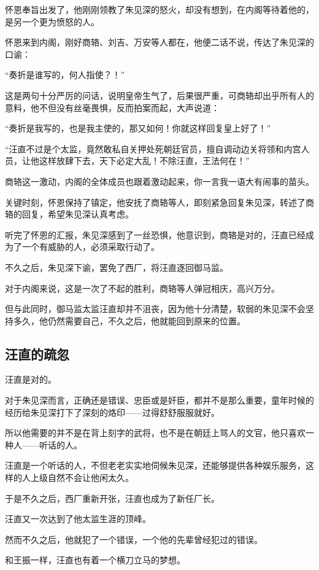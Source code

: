 \begin{multicols}{\theparacolNo}
		怀恩奉旨出发了，他刚刚领教了朱见深的怒火，却没有想到，在内阁等待着他的，是另一个更为愤怒的人。

		怀恩来到内阁，刚好商辂、刘吉、万安等人都在，他便二话不说，传达了朱见深的口谕：

		“奏折是谁写的，何人指使？！”

		这是两句十分严厉的问话，说明皇帝生气了，后果很严重，可商辂却出乎所有人的意料，他不但没有丝毫畏惧，反而拍案而起，大声说道：

		“奏折是我写的，也是我主使的，那又如何！你就这样回复皇上好了！”

		“汪直不过是个太监，竟然敢私自关押处死朝廷官员，擅自调动边关将领和内宫人员，让他这样放肆下去，天下必定大乱！不除汪直，王法何在！”

		商辂这一激动，内阁的全体成员也跟着激动起来，你一言我一语大有闹事的苗头。

		关键时刻，怀恩保持了镇定，他安抚了商辂等人，即刻紧急回复朱见深，转述了商辂的回复，希望朱见深认真考虑。

		听完了怀恩的汇报，朱见深感到了一丝恐惧，他意识到，商辂是对的，汪直已经成为了一个有威胁的人，必须采取行动了。

		不久之后，朱见深下谕，罢免了西厂，将汪直逐回御马监。

		对于内阁来说，这是一次了不起的胜利，商辂等人弹冠相庆，高兴万分。

		但与此同时，御马监太监汪直却并不沮丧，因为他十分清楚，软弱的朱见深不会坚持多久，他仍然需要自己，不久之后，他就能回到原来的位置。

		\subsection{汪直的疏忽}
		汪直是对的。

		对于朱见深而言，正确还是错误、忠臣或是奸臣，都并不是那么重要，童年时候的经历给朱见深打下了深刻的烙印——过得舒舒服服就好。

		所以他需要的并不是在背上刻字的武将，也不是在朝廷上骂人的文官，他只喜欢一种人——听话的人。

		汪直是一个听话的人，不但老老实实地伺候朱见深，还能够提供各种娱乐服务，这样的人上级自然不会让他闲太久。

		于是不久之后，西厂重新开张，汪直也成为了新任厂长。

		汪直又一次达到了他太监生涯的顶峰。

		然而不久之后，他就犯了一个错误，一个他的先辈曾经犯过的错误。

		和王振一样，汪直也有着一个横刀立马的梦想。


\end{multicols}
